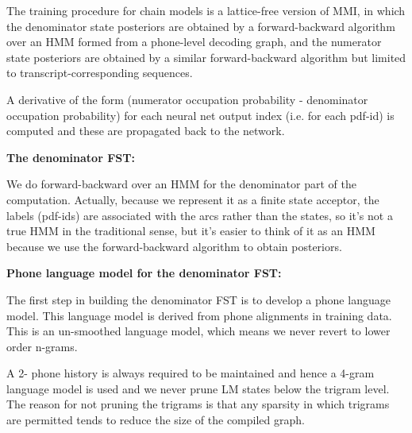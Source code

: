 The training procedure for chain models is a lattice-free version of MMI, in which the denominator state posteriors are obtained by a forward-backward algorithm over an HMM formed from a phone-level decoding graph, and the numerator state posteriors are obtained by a similar forward-backward algorithm but limited to transcript-corresponding sequences.

A derivative of the form (numerator occupation probability - denominator occupation probability) for each neural net output index (i.e. for each pdf-id) is computed and these are propagated back to the network.

\textbf{The denominator FST:}

We do forward-backward over an HMM for the denominator part of the computation. Actually, because we represent it as a finite state acceptor, the labels (pdf-ids) are associated with the arcs rather than the states, so it's not a true HMM in the traditional sense, but it's easier to think of it as an HMM because we use the forward-backward algorithm to obtain posteriors. %

\textbf{Phone language model for the denominator FST:}

The first step in building the denominator FST is to develop a phone language model. This language model is derived from phone alignments in training data. This is an un-smoothed language model, which means we never revert to lower order n-grams. %

A 2- phone history is always required to be maintained and hence a 4-gram language model is used and we never prune LM states below the trigram level. The reason for not pruning the trigrams is that any sparsity in which trigrams are permitted tends to reduce the size of the compiled graph. %


